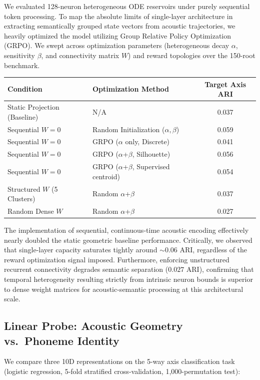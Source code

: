 \documentclass{article}
\begin{document}
We evaluated 128-neuron heterogeneous ODE reservoirs under purely sequential token processing. To map the absolute limits of single-layer architecture in extracting semantically grouped state vectors from acoustic trajectories, we heavily optimized the model utilizing Group Relative Policy Optimization (GRPO). We swept across optimization parameters (heterogeneous decay $\alpha$, sensitivity $\beta$, and connectivity matrix $W$) and reward topologies over the 150-root benchmark.

\begin{center}
\renewcommand{\arraystretch}{1.2}
\begin{tabular}{llc}
\toprule
\textbf{Condition} & \textbf{Optimization Method} & \textbf{Target Axis ARI}\\
\midrule
Static Projection (Baseline) & N/A & 0.037 \\
Sequential $W=0$ & Random Initialization ($\alpha, \beta$) & 0.059 \\
Sequential $W=0$ & GRPO ($\alpha$ only, Discrete) & 0.041 \\
Sequential $W=0$ & GRPO ($\alpha$+$\beta$, Silhouette) & 0.056 \\
Sequential $W=0$ & GRPO ($\alpha$+$\beta$, Supervised centroid) & 0.054 \\
Structured $W$ (5 Clusters) & Random $\alpha$+$\beta$ & 0.037 \\
Random Dense $W$ & Random $\alpha$+$\beta$ & 0.027 \\
\bottomrule
\end{tabular}
\end{center}

The implementation of sequential, continuous-time acoustic encoding effectively nearly doubled the static geometric baseline performance. Critically, we observed that single-layer capacity saturates tightly around $\sim0.06$ ARI, regardless of the reward optimization signal imposed. Furthermore, enforcing unstructured recurrent connectivity degrades semantic separation ($0.027$ ARI), confirming that temporal heterogeneity resulting strictly from intrinsic neuron bounds is superior to dense weight matrices for acoustic-semantic processing at this architectural scale.

\subsection{Linear Probe: Acoustic Geometry vs.\ Phoneme Identity}

We compare three 10D representations on the 5-way axis classification task (logistic regression, 5-fold stratified cross-validation, 1{,}000-permutation test):
\end{document}
